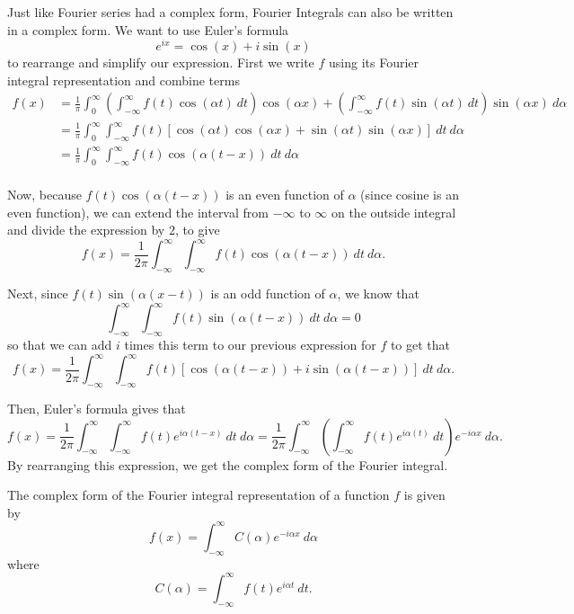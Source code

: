 \documentclass{ximera}
\begin{document}
Just like Fourier series had a complex form, Fourier Integrals can also be written in a complex form. We want to use Euler's formula
\[ 
    e^{ix} = \cos(x) + i \sin(x) 
\] 
to rearrange and simplify our expression. First we write $f$ using its Fourier integral representation and combine terms
\begin{equation*}
    \begin{split}
        f(x) &=  \frac{1}{\pi} \int_0^\infty \left( \int_{-\infty}^\infty f(t) \cos\left(\alpha t\right)\ dt\right) \cos\left(\alpha x\right) + \left( \int_{-\infty}^\infty f(t) \sin\left(\alpha t\right)\ dt\right) \sin\left(\alpha x\right) \ d\alpha \\
        &= \frac{1}{\pi} \int_0^\infty \int_{-\infty}^\infty f(t) \left[ \cos(\alpha t) \cos(\alpha x) + \sin(\alpha t) \sin(\alpha x) \right] \ dt \ d\alpha \\
        &= \frac{1}{\pi} \int_0^\infty \int_{-\infty}^\infty f(t) \cos(\alpha(t-x))\ dt\ d\alpha \\ 
    \end{split}
\end{equation*}

Now, because $f(t)\cos(\alpha(t-x))$ is an even function of $\alpha$ (since cosine is an even function), we can extend the interval from $-\infty$ to $\infty$ on the outside integral and divide the expression by $2$, to give
\[ 
    f(x) = \frac{1}{2\pi} \int_{-\infty}^\infty \int_{-\infty}^\infty f(t) \cos(\alpha(t-x))\ dt\ d\alpha. 
\]

Next, since $f(t) \sin(\alpha(x-t))$ is an odd function of $\alpha$, we know that 
\[  
    \int_{-\infty}^\infty \int_{-\infty}^\infty f(t) \sin(\alpha(t-x))\ dt\ d\alpha = 0 
\] 
so that we can add $i$ times this term to our previous expression for $f$ to get that
\[ 
    f(x) = \frac{1}{2\pi} \int_{-\infty}^\infty \int_{-\infty}^\infty f(t) \left[\cos(\alpha(t-x)) + i \sin(\alpha(t-x))\right] \ dt\ d\alpha. 
\]

Then, Euler's formula gives that
\[ 
    f(x) = \frac{1}{2\pi} \int_{-\infty}^\infty \int_{-\infty}^\infty f(t)e^{i\alpha(t-x)}\ dt\ d\alpha = \frac{1}{2\pi} \int_{-\infty}^\infty \left(\int_{-\infty}^\infty f(t)e^{i\alpha(t)}\ dt \right) e^{-i\alpha x}\ d\alpha. 
\]
By rearranging this expression, we get the complex form of the Fourier integral.

\begin{theorem}
    The complex form of the Fourier integral representation of a function $f$ is given by
    \[ 
        f(x) = \int_{-\infty}^\infty C(\alpha) e^{-i\alpha x}\ d\alpha 
    \] 
    where
    \[
        C(\alpha) = \int_{-\infty}^\infty f(t)e^{i\alpha t}\ dt.
    \]
\end{theorem}
\end{document}
